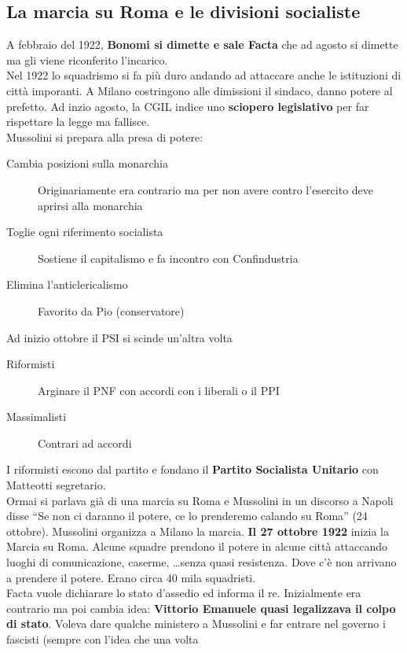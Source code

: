 \subsection{La marcia su Roma e le divisioni socialiste}
A febbraio del 1922, \textbf{Bonomi si dimette e sale Facta} che ad agosto si dimette ma gli viene
riconferito l'incarico.\\
Nel 1922 lo squadrismo si fa più duro andando ad attaccare anche le istituzioni di città imporanti.
A Milano costringono alle dimissioni il sindaco, danno potere al prefetto. Ad inzio agosto, la CGIL
indice uno \textbf{sciopero legislativo} per far rispettare la legge ma fallisce.\\ [\baselineskip]
Mussolini si prepara alla presa di potere:
\begin{description}
  \item[Cambia posizioni sulla monarchia] Originariamente era contrario ma per non avere contro
    l'esercito deve aprirsi alla monarchia
  \item[Toglie ogni riferimento socialista] Sostiene il capitalismo e fa incontro con Confindustria
  \item[Elimina l'anticlericalismo] Favorito da Pio  (conservatore)
\end{description}
Ad inizio ottobre il PSI si scinde un'altra volta
\begin{description}
  \item[Riformisti] Arginare il PNF con accordi con i liberali o il PPI
  \item[Massimalisti] Contrari ad accordi
\end{description}
I riformisti escono dal partito e fondano il \textbf{Partito Socialista Unitario} con Matteotti 
segretario.\\[\baselineskip]
Ormai si parlava già di una marcia su Roma e Mussolini in un discorso a Napoli disse ``Se non ci 
daranno il potere, ce lo prenderemo calando su Roma'' (24 ottobre). Mussolini organizza a Milano la
marcia. \textbf{Il 27 ottobre 1922} inizia la Marcia su Roma. Alcune squadre prendono il potere
in alcune città attaccando luoghi di comunicazione, caserme, \ldots senza quasi resistenza. Dove c'è
non arrivano a prendere il potere. Erano circa 40 mila squadristi.\\
Facta vuole dichiarare lo stato d'assedio ed informa il re. Inizialmente era contrario ma poi
cambia idea: \textbf{Vittorio Emanuele  quasi legalizzava il colpo di stato}. Voleva dare 
qualche ministero a Mussolini e far entrare nel governo i fascisti (sempre con l'idea che una volta
